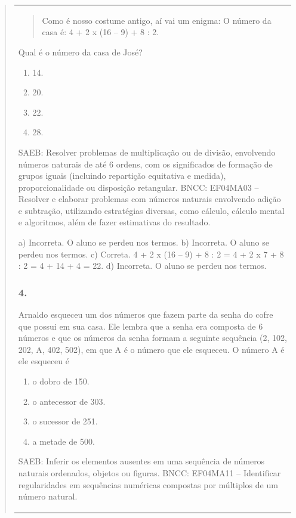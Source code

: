 \begin{mdframed}[linewidth=2pt,linecolor=salmao,roundcorner=2pt]
\begin{itemize}
{\begin{itemize}
\begin{escolha}
{\begin{quote}
{\begin{escolha}
{{{{{\begin{longtable}[]{@{}l@{}}
\begin{itemize}
{\begin{quote}
Como é nosso costume antigo, aí vai um enigma:
O número da casa é: 4 + 2 x (16 -- 9) + 8 : 2.
\end{quote}

Qual é o número da casa de José?

\begin{enumerate}
\item
  14.
\item
  20.
\item
  22.
\item
  28.
\end{enumerate}

SAEB: Resolver problemas de multiplicação ou de divisão, envolvendo números
naturais de até 6 ordens, com os significados de formação de grupos
iguais (incluindo repartição equitativa e medida), proporcionalidade ou
disposição retangular.
BNCC: EF04MA03 -- Resolver e elaborar problemas com números naturais envolvendo adição e subtração,
utilizando estratégias diversas, como cálculo, cálculo mental e algoritmos, além de fazer estimativas
do resultado.

a) Incorreta. O aluno se perdeu nos termos.
b) Incorreta. O aluno se perdeu nos termos.
c) Correta. 4 + 2 x (16 -- 9) + 8 : 2 = 4 + 2 x 7 + 8 : 2 = 4 + 14 + 4 = 22.
d) Incorreta. O aluno se perdeu nos termos.

\subsubsection{4. }

Arnaldo esqueceu um dos números que fazem parte da senha do cofre que
possui em sua casa. Ele lembra que a senha era composta de 6 números e
que os números da senha formam a seguinte sequência (2, 102, 202,
A, 402, 502), em que A é o número que ele esqueceu. O número A é
ele esqueceu é

\begin{enumerate}
\item
  o dobro de 150.
\item
  o antecessor de 303.
\item
  o sucessor de 251.
\item
  a metade de 500.
\end{enumerate}

SAEB: Inferir os elementos ausentes em uma sequência de
números naturais ordenados, objetos ou figuras.
BNCC: EF04MA11 -- Identificar regularidades em sequências numéricas compostas por múltiplos de um
número natural.

}
\end{itemize}
\end{longtable}}}}}}
\end{escolha}}
\end{quote}}
\end{escolha}
\end{itemize}}
\end{itemize}
\end{mdframed}
